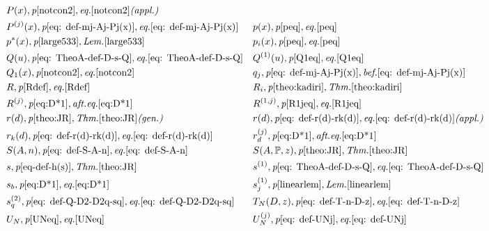 \documentclass[12pt]{amsart}
\begin{document}
{\begin{align*}
    &P(x),\textit{p}\pageref{notcon2},\textit{eq.}\eqref{notcon2} \textit{(appl.)}\\
    &P^{(j)}(x),\textit{p}\pageref{eq: def-mj-Aj-Pj(x)},\textit{eq.}\eqref{eq: def-mj-Aj-Pj(x)}&
    &p(x),\textit{p}\pageref{peq},\textit{eq.}\eqref{peq}\\
    &p^*(x),\textit{p}\pageref{large533}, \textit{Lem.} \ref{large533}&
    &p_i(x),\textit{p}\pageref{peq},\textit{eq.}\eqref{peq}\\
    &Q(u),\textit{p}\pageref{eq: TheoA-def-D-s-Q},\textit{eq.}\eqref{eq: TheoA-def-D-s-Q}&
    &Q^{(1)}(u),\textit{p}\pageref{Q1eq},\textit{eq.}\eqref{Q1eq}\\
    &Q_1(x),\textit{p}\pageref{notcon2},\textit{eq.}\eqref{notcon2}&
    &q_j,\textit{p}\pageref{eq: def-mj-Aj-Pj(x)}, \textit{bef.} \eqref{eq: def-mj-Aj-Pj(x)}\\
    &R,\textit{p}\pageref{Rdef},\textit{eq.}\eqref{Rdef}&
    &R_i,\textit{p}\pageref{theo:kadiri},\textit{Thm.} \ref{theo:kadiri}\\
    &R^{(j)},\textit{p}\pageref{eq:D*1},\textit{aft.eq.}\eqref{eq:D*1}&
    &R^{(1,j)},\textit{p}\pageref{R1jeq},\textit{eq.}\eqref{R1jeq}\\
    &r(d),\textit{p}\pageref{theo:JR},\textit{Thm.} \ref{theo:JR} \textit{(gen.)}&
    &r(d),\textit{p}\pageref{eq: def-r(d)-rk(d)},\textit{eq.} \eqref{eq: def-r(d)-rk(d)} \textit{(appl.)}\\
    &r_k(d),\textit{p}\pageref{eq: def-r(d)-rk(d)},\textit{eq.} \eqref{eq: def-r(d)-rk(d)}&
    &r_d^{(j)},\textit{p}\pageref{eq:D*1},\textit{aft.eq.}\eqref{eq:D*1}\\
    &S(A,n),\textit{p}\pageref{eq: def-S-A-n},\textit{eq.}\eqref{eq: def-S-A-n}&
    &S(A, \mathbb{P}, z),\textit{p}\pageref{theo:JR},\textit{Thm.} \ref{theo:JR}\\
    &s,\textit{p}\pageref{eq-def-h(s)},\textit{Thm.} \ref{theo:JR}&
    &s^{(1)},\textit{p}\pageref{eq: TheoA-def-D-s-Q},\textit{eq.}\eqref{eq: TheoA-def-D-s-Q}\\
    &s_b,\textit{p}\pageref{eq:D*1},\textit{eq.}\eqref{eq:D*1}&
    &s^{(1)}_j,\textit{p}\pageref{linearlem},\textit{Lem.}\ref{linearlem}\\
    &s^{(2)}_q,\textit{p}\pageref{eq: def-Q-D2-D2q-sq},\textit{eq.}\eqref{eq: def-Q-D2-D2q-sq}&
    &T_N(D,z),\textit{p}\pageref{eq: def-T-n-D-z},\textit{eq.}\eqref{eq: def-T-n-D-z}\\
    &U_N,\textit{p}\pageref{UNeq},\textit{eq.}\eqref{UNeq}&
    &U^{(j)}_N,\textit{p}\pageref{eq: def-UNj},\textit{eq.}\eqref{eq: def-UNj}\\

\end{align*}}
\end{document}
